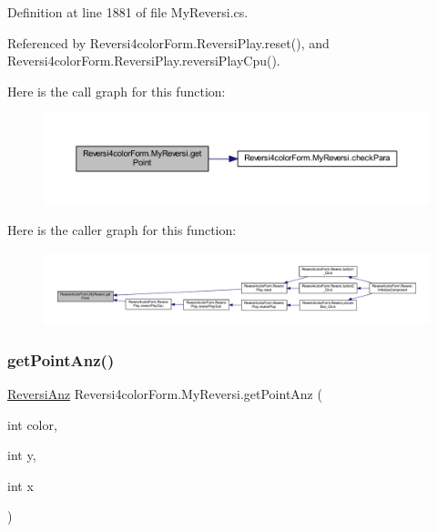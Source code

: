 Definition at line 1881 of file My\+Reversi.\+cs.



Referenced by Reversi4color\+Form.\+Reversi\+Play.\+reset(), and Reversi4color\+Form.\+Reversi\+Play.\+reversi\+Play\+Cpu().

Here is the call graph for this function\+:
\nopagebreak
\begin{figure}[H]
\begin{center}
\leavevmode
\includegraphics[width=350pt]{class_reversi4color_form_1_1_my_reversi_a5af52fd8272221e7fecfc8375a9f7be2_cgraph}
\end{center}
\end{figure}
Here is the caller graph for this function\+:
\nopagebreak
\begin{figure}[H]
\begin{center}
\leavevmode
\includegraphics[width=350pt]{class_reversi4color_form_1_1_my_reversi_a5af52fd8272221e7fecfc8375a9f7be2_icgraph}
\end{center}
\end{figure}
\mbox{\label{class_reversi4color_form_1_1_my_reversi_ad0027ead546dfa8a7844e54fb0dddfab}} 
\subsubsection{\texorpdfstring{get\+Point\+Anz()}{getPointAnz()}}
{\footnotesize\ttfamily \hyperlink{class_reversi4color_form_1_1_reversi_anz}{Reversi\+Anz} Reversi4color\+Form.\+My\+Reversi.\+get\+Point\+Anz (\begin{DoxyParamCaption}\item[{int}]{color,  }\item[{int}]{y,  }\item[{int}]{x }\end{DoxyParamCaption})}



